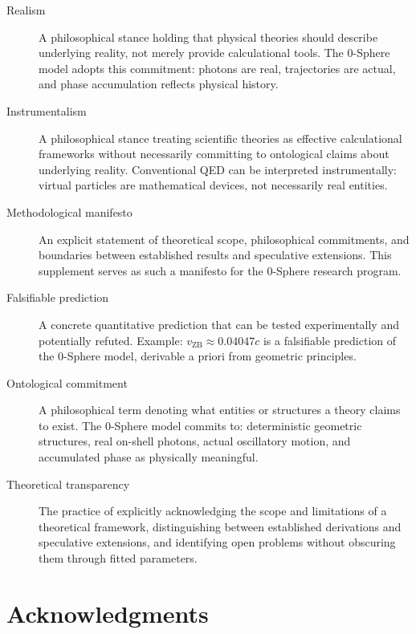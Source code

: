 \documentclass[12pt,letterpaper]{article}
\begin{document}
\begin{description}
\item[Realism] A philosophical stance holding that physical theories should describe underlying reality, not merely provide calculational tools. The 0-Sphere model adopts this commitment: photons are real, trajectories are actual, and phase accumulation reflects physical history.

\item[Instrumentalism] A philosophical stance treating scientific theories as effective calculational frameworks without necessarily committing to ontological claims about underlying reality. Conventional QED can be interpreted instrumentally: virtual particles are mathematical devices, not necessarily real entities.

\item[Methodological manifesto] An explicit statement of theoretical scope, philosophical commitments, and boundaries between established results and speculative extensions. This supplement serves as such a manifesto for the 0-Sphere research program.

\item[Falsifiable prediction] A concrete quantitative prediction that can be tested experimentally and potentially refuted. Example: $v_{\mathrm{ZB}} \approx 0.04047c$ is a falsifiable prediction of the 0-Sphere model, derivable a priori from geometric principles.

\item[Ontological commitment] A philosophical term denoting what entities or structures a theory claims to exist. The 0-Sphere model commits to: deterministic geometric structures, real on-shell photons, actual oscillatory motion, and accumulated phase as physically meaningful.

\item[Theoretical transparency] The practice of explicitly acknowledging the scope and limitations of a theoretical framework, distinguishing between established derivations and speculative extensions, and identifying open problems without obscuring them through fitted parameters.

\end{description}



\section*{Acknowledgments}
\end{document}
